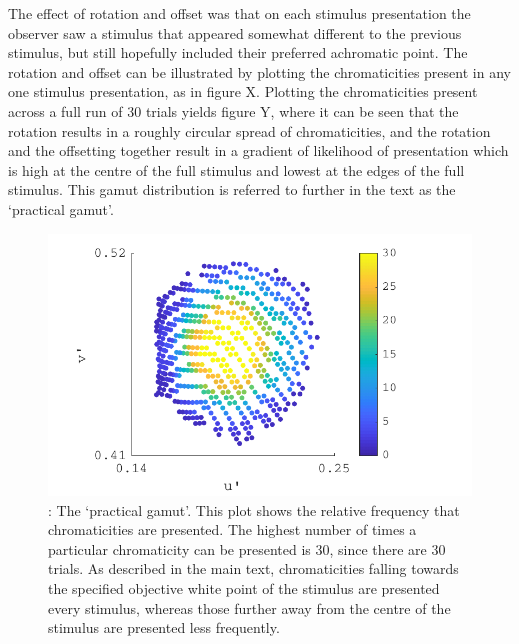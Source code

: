 The effect of rotation and offset was that on each stimulus presentation the observer saw a stimulus that appeared somewhat different to the previous stimulus, but still hopefully included their preferred achromatic point. The rotation and offset can be illustrated by plotting the chromaticities present in any one stimulus presentation, as in figure X. Plotting the chromaticities present across a full run of 30 trials yields figure Y, where it can be seen that the rotation results in a roughly circular spread of chromaticities, and the rotation and the offsetting together result in a gradient of likelihood of presentation which is high at the centre of the full stimulus and lowest at the edges of the full stimulus. This gamut distribution is referred to further in the text as the `practical gamut'.



\begin{figure}[hbp]
\includegraphics[width=\textwidth]{figs/tablet/practical_gamut.pdf}
\caption{: The `practical gamut'. This plot shows the relative frequency that chromaticities are presented. The highest number of times a particular chromaticity can be presented is 30, since there are 30 trials. As described in the main text, chromaticities falling towards the specified objective white point of the stimulus are presented every stimulus, whereas those further away from the centre of the stimulus are presented less frequently.}
\label{fig:practical}
\end{figure}

